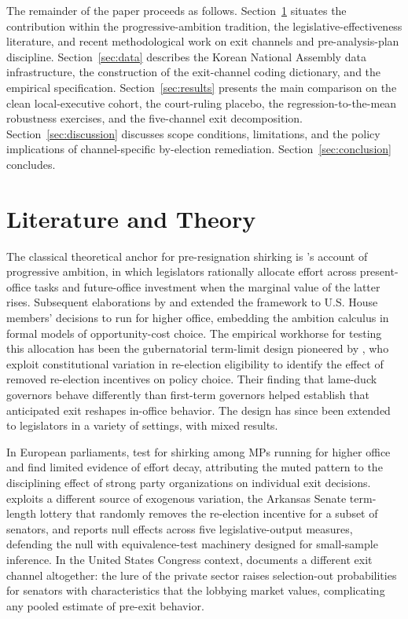 \documentclass[11pt]{article}
\begin{document}
The remainder of the paper proceeds as follows. Section~\ref{sec:lit} situates the contribution within the progressive-ambition tradition, the legislative-effectiveness literature, and recent methodological work on exit channels and pre-analysis-plan discipline. Section~\ref{sec:data} describes the Korean National Assembly data infrastructure, the construction of the exit-channel coding dictionary, and the empirical specification. Section~\ref{sec:results} presents the main comparison on the clean local-executive cohort, the court-ruling placebo, the regression-to-the-mean robustness exercises, and the five-channel exit decomposition. Section~\ref{sec:discussion} discusses scope conditions, limitations, and the policy implications of channel-specific by-election remediation. Section~\ref{sec:conclusion} concludes.

\section{Literature and Theory}\label{sec:lit}

The classical theoretical anchor for pre-resignation shirking is \citet{schlesinger1966}'s account of progressive ambition, in which legislators rationally allocate effort across present-office tasks and future-office investment when the marginal value of the latter rises. Subsequent elaborations by \citet{black1972} and \citet{rohde1979} extended the framework to U.S. House members' decisions to run for higher office, embedding the ambition calculus in formal models of opportunity-cost choice. The empirical workhorse for testing this allocation has been the gubernatorial term-limit design pioneered by \citet{besley1995}, who exploit constitutional variation in re-election eligibility to identify the effect of removed re-election incentives on policy choice. Their finding that lame-duck governors behave differently than first-term governors helped establish that anticipated exit reshapes in-office behavior. The design has since been extended to legislators in a variety of settings, with mixed results.

In European parliaments, \citet{hansen2015} test for shirking among MPs running for higher office and find limited evidence of effort decay, attributing the muted pattern to the disciplining effect of strong party organizations on individual exit decisions. \citet{titiunik2017} exploits a different source of exogenous variation, the Arkansas Senate term-length lottery that randomly removes the re-election incentive for a subset of senators, and reports null effects across five legislative-output measures, defending the null with equivalence-test machinery designed for small-sample inference. In the United States Congress context, \citet{egerod2021} documents a different exit channel altogether: the lure of the private sector raises selection-out probabilities for senators with characteristics that the lobbying market values, complicating any pooled estimate of pre-exit behavior.
\end{document}
